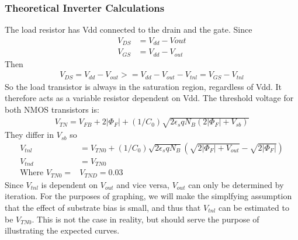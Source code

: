 \documentclass{article}
\begin{document}
\subsubsection{Theoretical Inverter Calculations}

The load resistor has Vdd connected to the drain and the gate. Since
\begin{align*}
V_{DS} &= V_{dd} - V{out} \\
V_{GS} &= V_{dd} - V_{out}
\end{align*} 
Then 
\begin{align*}
V_{DS} = V_{dd} - V_{out} >= V_{dd} - V_{out} - V_{tnl} = V_{GS} - V_{tnl}
\end{align*}
So the load transistor is always in the saturation region, regardless of Vdd. It therefore acts as a variable resistor dependent on Vdd. The threshold voltage for both NMOS transistors is:
\begin{align*}
V_{TN} = V_{FB} + 2|\Phi_F| + (1/C_0)\sqrt{2\epsilon_s q N_B (2|\Phi_F| + V_{sb})}
\end{align*}
They differ in $V_{sb}$ so 
\begin{align*}
V_{tnl} &= V_{TN0} + (1/C_0)\sqrt{2\epsilon_s q N_B}(\sqrt{2|\Phi_F| + V_{out}} - \sqrt{2|\Phi_F|}) \\
V_{tnd} &= V_{TN0} \\
\text{Where } V_{TN0} =& V_{TND} = 0.03
\end{align*}
Since $V_{tnl}$ is dependent on $V_{out}$ and vice versa, $V_{out}$ can only be determined by iteration. For the purposes of graphing, we will make the simplfying assumption that the effect of substrate bias is small, and thus that $V_{tnl}$ can be estimated to be $V_{TN0}$. This is not the case in reality, but should serve the purpose of illustrating the expected curves.
\end{document}
